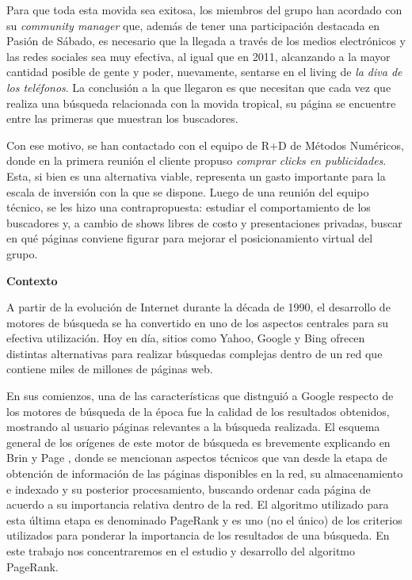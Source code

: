 Para que toda esta movida sea exitosa, los miembros del grupo han acordado con su \emph{community manager} que, adem\'as de
tener una participaci\'on destacada en Pasi\'on de S\'abado, es necesario que la llegada a trav\'es de los medios electr\'onicos
y las redes sociales sea muy efectiva, al igual que en 2011, alcanzando a la mayor cantidad posible de gente y poder, nuevamente, 
sentarse en el living de \emph{la diva de los tel\'efonos}. La conclusi\'on a la que llegaron es que necesitan que cada vez que 
realiza una b\'usqueda relacionada con la movida tropical, su p\'agina se encuentre entre las primeras que muestran los buscadores.

Con ese motivo, se han contactado con el equipo de R+D de M\'etodos Num\'ericos, donde en la primera reuni\'on el cliente propuso
\emph{comprar clicks en publicidades}. Esta, si bien es una alternativa viable, representa un gasto importante para la escala de
inversi\'on con la que se dispone. Luego de una reuni\'on del equipo t\'ecnico, se les hizo una contrapropuesta:
estudiar el comportamiento de los buscadores y, a cambio de shows libres de costo y presentaciones privadas, buscar en qu\'e
p\'aginas conviene figurar para mejorar el posicionamiento virtual del grupo.
 
\vskip 5pt
\noindent\textbf{Contexto}
\vskip 5pt

A partir de la evoluci\'on de Internet durante la d\'ecada de 1990, el desarrollo de motores de b\'usqueda se ha convertido
en uno de los aspectos centrales para su efectiva utilizaci\'on. Hoy en d\'ia, sitios como Yahoo, Google y Bing ofrecen
distintas alternativas para realizar b\'usquedas complejas dentro de un red que contiene miles de millones de p\'aginas
web. 

En sus comienzos, una de las caracter\'isticas que distngui\'o a Google respecto de los motores de b\'usqueda de la \'epoca
fue la calidad de los resultados obtenidos, mostrando al usuario p\'aginas relevantes a la
b\'usqueda realizada. El esquema general de los or\'igenes de este motor de b\'usqueda es brevemente explicando en 
Brin y Page \cite{Brin1998}, donde se mencionan aspectos t\'ecnicos que van desde la etapa de obtenci\'on de
informaci\'on de las p\'aginas disponibles en la red, su almacenamiento e indexado y su posterior procesamiento,
buscando ordenar cada p\'agina de acuerdo a su importancia relativa dentro de la red. El algoritmo utilizado para esta
\'ultima etapa es denominado PageRank y es uno (no el \'unico) de los criterios utilizados para ponderar la importancia
de los resultados de una b\'usqueda. En este trabajo nos concentraremos en el estudio y desarrollo del algoritmo
PageRank.

